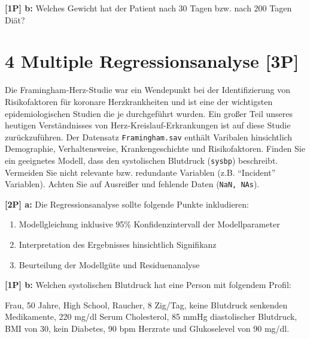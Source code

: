 \documentclass[
]{article}
\providecommand{\tightlist}{%
  \setlength{\itemsep}{0pt}\setlength{\parskip}{0pt}}
\begin{document}
\textbf{{[}1P{]} b:} Welches Gewicht hat der Patient nach 30 Tagen bzw.
nach 200 Tagen Diät?

\hypertarget{multiple-regressionsanalyse-3p}{%
\section{4 Multiple Regressionsanalyse
{[}3P{]}}\label{multiple-regressionsanalyse-3p}}

Die Framingham-Herz-Studie war ein Wendepunkt bei der Identifizierung
von Risikofaktoren für koronare Herzkrankheiten und ist eine der
wichtigsten epidemiologischen Studien die je durchgeführt wurden. Ein
großer Teil unseres heutigen Verständnisses von
Herz-Kreislauf-Erkrankungen ist auf diese Studie zurückzuführen. Der
Datensatz \texttt{Framingham.sav} enthält Varibalen hinsichtlich
Demographie, Verhaltensweise, Krankengeschichte und Risikofaktoren.
Finden Sie ein geeignetes Modell, dass den systolischen Blutdruck
(\texttt{sysbp}) beschreibt. Vermeiden Sie nicht relevante bzw.
redundante Variablen (z.B. ``Incident'' Variablen). Achten Sie auf
Ausreißer und fehlende Daten (\texttt{NaN,\ NA\textquotesingle{}s}).

\textbf{{[}2P{]} a:} Die Regressionsanalyse sollte folgende Punkte
inkludieren:

\begin{enumerate}
\def\labelenumi{\roman{enumi})}
\tightlist
\item
  Modellgleichung inklusive 95\% Konfidenzintervall der Modellparameter
\item
  Interpretation des Ergebnisses hinsichtlich Signifikanz
\item
  Beurteilung der Modellgüte und Residuenanalyse
\end{enumerate}

\textbf{{[}1P{]} b:} Welchen systolischen Blutdruck hat eine Person mit
folgendem Profil:

Frau, 50 Jahre, High School, Raucher, 8 Zig/Tag, keine Blutdruck
senkenden Medikamente, 220 mg/dl Serum Cholesterol, 85 mmHg
diastolischer Blutdruck, BMI von 30, kein Diabetes, 90 bpm Herzrate und
Glukoselevel von 90 mg/dl.
\end{document}
